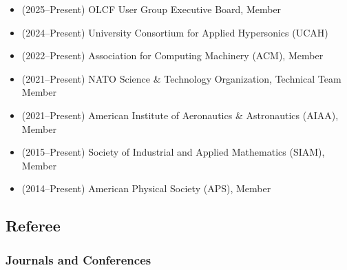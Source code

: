 \begin{itemize}
    \item (2025--Present) OLCF User Group Executive Board, Member
    \item (2024--Present) University Consortium for Applied Hypersonics (UCAH)
    \item (2022--Present) Association for Computing Machinery (ACM), Member
    \item (2021--Present) NATO Science \& Technology Organization, Technical Team Member
    \item (2021--Present) American Institute of Aeronautics \& Astronautics (AIAA), Member
    \item (2015--Present) Society of Industrial and Applied Mathematics (SIAM), Member
    \item (2014--Present) American Physical Society (APS), Member
\end{itemize}

\subsection{Referee}

\subsubsection{Journals and Conferences}

